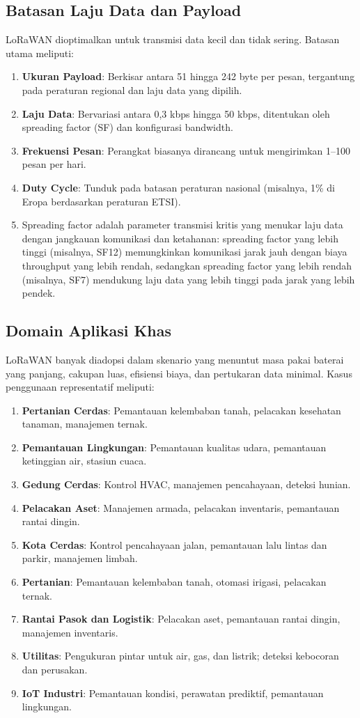 \subsection{Batasan Laju Data dan Payload}
LoRaWAN dioptimalkan untuk transmisi data kecil dan tidak sering. Batasan utama meliputi:
\begin{enumerate}
    \item \textbf{Ukuran Payload}: Berkisar antara 51 hingga 242 byte per pesan, tergantung pada peraturan regional dan laju data yang dipilih.
    \item \textbf{Laju Data}: Bervariasi antara 0,3 kbps hingga 50 kbps, ditentukan oleh spreading factor (SF) dan konfigurasi bandwidth.
    \item \textbf{Frekuensi Pesan}: Perangkat biasanya dirancang untuk mengirimkan 1–100 pesan per hari.
    \item \textbf{Duty Cycle}: Tunduk pada batasan peraturan nasional (misalnya, 1\% di Eropa berdasarkan peraturan ETSI).
    \item Spreading factor adalah parameter transmisi kritis yang menukar laju data dengan jangkauan komunikasi dan ketahanan: spreading factor yang lebih tinggi (misalnya, SF12) memungkinkan komunikasi jarak jauh dengan biaya throughput yang lebih rendah, sedangkan spreading factor yang lebih rendah (misalnya, SF7) mendukung laju data yang lebih tinggi pada jarak yang lebih pendek.
\end{enumerate}
\subsection{Domain Aplikasi Khas}
LoRaWAN banyak diadopsi dalam skenario yang menuntut masa pakai baterai yang panjang, cakupan luas, efisiensi biaya, dan pertukaran data minimal. Kasus penggunaan representatif meliputi:
\begin{enumerate}
    \item \textbf{Pertanian Cerdas}: Pemantauan kelembaban tanah, pelacakan kesehatan tanaman, manajemen ternak.
    \item \textbf{Pemantauan Lingkungan}: Pemantauan kualitas udara, pemantauan ketinggian air, stasiun cuaca.
    \item \textbf{Gedung Cerdas}: Kontrol HVAC, manajemen pencahayaan, deteksi hunian.
    \item \textbf{Pelacakan Aset}: Manajemen armada, pelacakan inventaris, pemantauan rantai dingin.
    \item \textbf{Kota Cerdas}: Kontrol pencahayaan jalan, pemantauan lalu lintas dan parkir, manajemen limbah.
    \item \textbf{Pertanian}: Pemantauan kelembaban tanah, otomasi irigasi, pelacakan ternak.
    \item \textbf{Rantai Pasok dan Logistik}: Pelacakan aset, pemantauan rantai dingin, manajemen inventaris.
    \item \textbf{Utilitas}: Pengukuran pintar untuk air, gas, dan listrik; deteksi kebocoran dan perusakan.
    \item \textbf{IoT Industri}: Pemantauan kondisi, perawatan prediktif, pemantauan lingkungan.
\end{enumerate}
